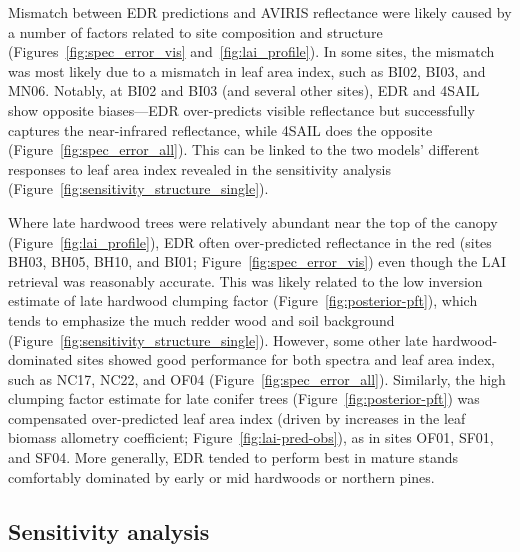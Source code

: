 
Mismatch between EDR predictions and AVIRIS reflectance were likely caused by a number of factors related to site composition and structure (Figures~\ref{fig:spec_error_vis} and~\ref{fig:lai_profile}).
In some sites, the mismatch was most likely due to a mismatch in leaf area index, such as BI02, BI03, and MN06.
Notably, at BI02 and BI03 (and several other sites), EDR and 4SAIL show opposite biases---EDR over-predicts visible reflectance but successfully captures the near-infrared reflectance, while 4SAIL does the opposite (Figure~\ref{fig:spec_error_all}).
This can be linked to the two models' different responses to leaf area index revealed in the sensitivity analysis (Figure~\ref{fig:sensitivity_structure_single}).

Where late hardwood trees were relatively abundant near the top of the canopy (Figure~\ref{fig:lai_profile}), EDR often over-predicted reflectance in the red (sites BH03, BH05, BH10, and BI01; Figure~\ref{fig:spec_error_vis}) even though the LAI retrieval was reasonably accurate.
This was likely related to the low inversion estimate of late hardwood clumping factor (Figure~\ref{fig:posterior-pft}), which tends to emphasize the much redder wood and soil background (Figure~\ref{fig:sensitivity_structure_single}).
However, some other late hardwood-dominated sites showed good performance for both spectra and leaf area index, such as NC17, NC22, and OF04 (Figure~\ref{fig:spec_error_all}).
Similarly, the high clumping factor estimate for late conifer trees (Figure~\ref{fig:posterior-pft}) was compensated over-predicted leaf area index (driven by increases in the leaf biomass allometry coefficient; Figure~\ref{fig:lai-pred-obs}), as in sites OF01, SF01, and SF04.
More generally, EDR tended to perform best in mature stands comfortably dominated by early or mid hardwoods or northern pines.

\subsection{Sensitivity analysis}

